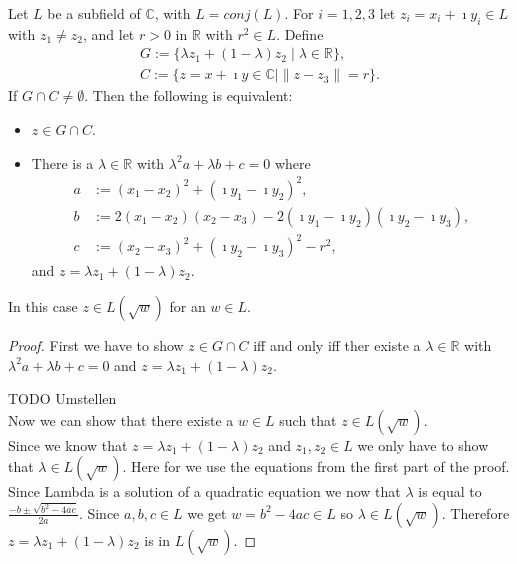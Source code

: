 \begin{lemma}
    \label{Intersection_line_circle}
    Let $L$ be a subfield of $\mathbb{C}$, with $L = conj(L)$. For $i = 1,2,3$ let $z_i = x_i + \imath y_i \in L$ with $z_1 \ne z_2$, and let $r > 0$ in $\mathbb{R}$ with $r^2 \in L$. Define
    \begin{equation*}\begin{aligned}
        G := \{\lambda z_1 + (1-\lambda)z_2 \mid \lambda \in \mathbb{R}\},\\
        C := \{z = x + \imath y \in \mathbb{C} \mid \|z - z_3\| = r\}.
    \end{aligned} \end{equation*}
    If $G \cap C \ne \emptyset$. Then the following is equivalent:
    \begin{itemize}
        \item $z\in G \cap C$.
        \item There is a $\lambda \in \mathbb{R}$ with $\lambda^2 a+ \lambda b + c = 0$ where
        \begin{align*}
            a &:= (x_1 - x_2)^2 + (\imath y_1 - \imath y_2)^2,\\
            b &:= 2(x_1 - x_2)(x_2 - x_3) - 2(\imath y_1 - \imath y_2)(\imath y_2 - \imath y_3),\\
            c &:= (x_2 - x_3)^2 + (\imath y_2 - \imath y_3)^2 - r^2,
        \end{align*}
        and $z = \lambda z_1 + (1-\lambda)z_2$.
    \end{itemize}
    In this case $z \in L(\sqrt{w})$ for an $w \in L$.
\end{lemma}

\begin{proof}
First we have to show $z \in G \cap C$ iff and only iff ther existe a $\lambda \in \mathbb{R}$ with $\lambda^2 a+ \lambda b + c = 0$ and $z = \lambda z_1 + (1-\lambda)z_2$.

TODO Umstellen \\
Now we can show that there existe a $w \in L$ such that $z \in L(\sqrt{w})$.\\
Since we know that $z = \lambda z_1 + (1-\lambda)z_2$ and $z_1, z_2 \in L$ we only have to show that $\lambda \in L(\sqrt{w})$. Here for we use the equations from the first part of the proof. 
Since Lambda is a solution of a quadratic equation we now that $\lambda$ is equal to $\frac{-b \pm \sqrt{b^2 - 4ac}}{2a}$. Since $a,b,c \in L$ we get $w = b^2 - 4ac \in L$ so $\lambda \in L(\sqrt{w})$. Therefore $z = \lambda z_1 + (1-\lambda)z_2$ is in $L(\sqrt{w})$.
\end{proof}

